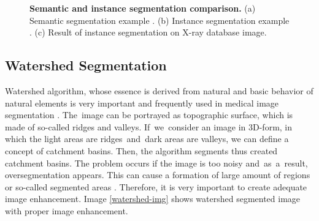 \begin{figure}[!ht]
    \begin{subfigure}[b]{.4\textwidth}
    \centering
        \caption{}\label{detectron-instance-seg}
    \end{subfigure}
    \caption{\textbf{Semantic and instance segmentation comparison.} (a) Semantic segmentation example \cite{semantic-vs-instance-seg}. (b) Instance segmentation example \cite{semantic-vs-instance-seg}. (c) Result of instance segmentation on X-ray database image.}
    \label{sem-seg-comparision}
\end{figure}

\subsection{Watershed Segmentation}
\label{watershed}
Watershed algorithm, whose essence is derived from natural and basic behavior of natural elements is very important and frequently used in medical image segmentation \cite{watershed-segm}. The~image can be portrayed as topographic surface, which is made of so-called ridges and valleys. If~we~consider an image in 3D-form, in which the light areas are ridges~and~dark areas are valleys, we can define a concept of catchment basins. Then, the algorithm segments thus created catchment basins. The problem occurs if the image is too noisy and~as~a~result, oversegmentation appears. This can cause a formation of large amount of regions or so-called segmented areas \cite{watershed, many-approaches}. Therefore, it is very important to create adequate image enhancement. Image \ref{watershed-img} shows watershed segmented image with proper image enhancement.

